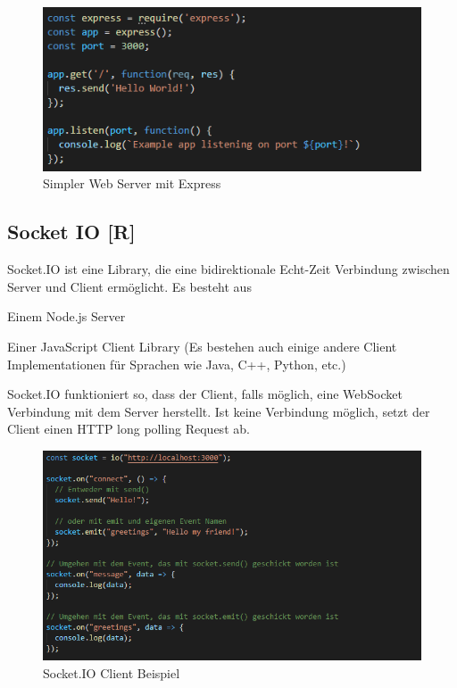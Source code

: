 \begin{figure}[H]
    \centering
    \includegraphics[scale=1]{pics/Express.PNG}
    \caption{Simpler Web Server mit Express}
\end{figure}

\subsection{Socket IO [R]}

Socket.IO ist eine Library, die eine bidirektionale Echt-Zeit Verbindung zwischen Server und Client ermöglicht. Es besteht aus
\begin{compactitem}
    \item Einem Node.js Server
    \item Einer JavaScript Client Library (Es bestehen auch einige andere Client Implementationen für Sprachen wie Java, C++, Python, etc.)
\end{compactitem}

Socket.IO funktioniert so, dass der Client, falls möglich, eine WebSocket Verbindung mit dem Server herstellt.
Ist keine Verbindung möglich, setzt der Client einen HTTP long polling Request ab.

\begin{figure}[H]
    \centering
    \includegraphics[scale=1]{pics/SocketIO_client.PNG}
    \caption{Socket.IO Client Beispiel}
\end{figure}

